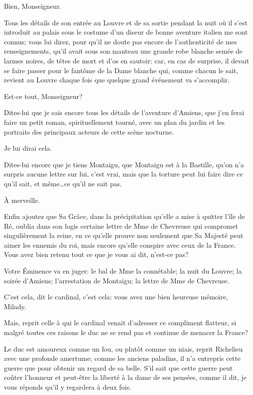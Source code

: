 \speak  Bien, Monseigneur. 

\speak  Tous les détails de son entrée au Louvre et de sa sortie pendant la nuit où il s'est introduit au palais sous le costume d'un diseur de bonne aventure italien me sont connus; vous lui direz, pour qu'il ne doute pas encore de l'authenticité de mes renseignements, qu'il avait sous son manteau une grande robe blanche semée de larmes noires, de têtes de mort et d'os en sautoir: car, en cas de surprise, il devait se faire passer pour le fantôme de la Dame blanche qui, comme chacun le sait, revient au Louvre chaque fois que quelque grand événement va s'accomplir. 

\speak  Est-ce tout, Monseigneur? 

\speak  Dites-lui que je sais encore tous les détails de l'aventure d'Amiens, que j'en ferai faire un petit roman, spirituellement tourné, avec un plan du jardin et les portraits des principaux acteurs de cette scène nocturne. 

\speak  Je lui dirai cela. 

\speak  Dites-lui encore que je tiens Montaigu, que Montaigu est à la Bastille, qu'on n'a surpris aucune lettre sur lui, c'est vrai, mais que la torture peut lui faire dire ce qu'il sait, et même\dots ce qu'il ne sait pas. 

\speak  À merveille. 

\speak  Enfin ajoutez que Sa Grâce, dans la précipitation qu'elle a mise à quitter l'île de Ré, oublia dans son logis certaine lettre de Mme de Chevreuse qui compromet singulièrement la reine, en ce qu'elle prouve non seulement que Sa Majesté peut aimer les ennemis du roi, mais encore qu'elle conspire avec ceux de la France. Vous avez bien retenu tout ce que je vous ai dit, n'est-ce pas? 

\speak  Votre Éminence va en juger: le bal de Mme la connétable; la nuit du Louvre; la soirée d'Amiens; l'arrestation de Montaigu; la lettre de Mme de Chevreuse. 

\speak  C'est cela, dit le cardinal, c'est cela: vous avez une bien heureuse mémoire, Milady. 

\speak  Mais, reprit celle à qui le cardinal venait d'adresser ce compliment flatteur, si malgré toutes ces raisons le duc ne se rend pas et continue de menacer la France? 

\speak  Le duc est amoureux comme un fou, ou plutôt comme un niais, reprit Richelieu avec une profonde amertume; comme les anciens paladins, il n'a entrepris cette guerre que pour obtenir un regard de sa belle. S'il sait que cette guerre peut coûter l'honneur et peut-être la liberté à la dame de ses pensées, comme il dit, je vous réponds qu'il y regardera à deux fois. 

